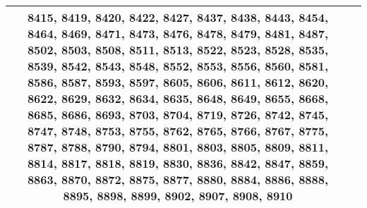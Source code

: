 \documentclass[12pt]{article}
\begin{document}
\begin{tabular}{|c|p{15cm}|}
8415, 8419, 8420, 8422, 8427, 8437, 8438, 8443, 8454, 8464, 8469, 8471, 8473, 8476, 8478, 8479, 8481, 8487, 8502, 8503, 8508, 8511, 8513, 8522, 8523, 8528, 8535, 8539, 8542, 8543, 8548, 8552, 8553, 8556, 8560, 8581, 8586, 8587, 8593, 8597, 8605, 8606, 8611, 8612, 8620, 8622, 8629, 8632, 8634, 8635, 8648, 8649, 8655, 8668, 8685, 8686, 8693, 8703, 8704, 8719, 8726, 8742, 8745, 8747, 8748, 8753, 8755, 8762, 8765, 8766, 8767, 8775, 8787, 8788, 8790, 8794, 8801, 8803, 8805, 8809, 8811, 8814, 8817, 8818, 8819, 8830, 8836, 8842, 8847, 8859, 8863, 8870, 8872, 8875, 8877, 8880, 8884, 8886, 8888, 8895, 8898, 8899, 8902, 8907, 8908, 8910} \\
    \hline
\end{tabular}
\end{document}
